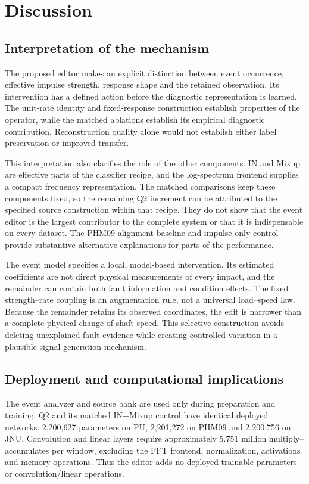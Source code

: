 \documentclass[a4paper,fleqn]{cas-sc}
\begin{document}


\section{Discussion}
\subsection{Interpretation of the mechanism}
The proposed editor makes an explicit distinction between event occurrence, effective impulse strength, response shape and the retained observation. Its intervention has a defined action before the diagnostic representation is learned. The unit-rate identity and fixed-response construction establish properties of the operator, while the matched ablations establish its empirical diagnostic contribution. Reconstruction quality alone would not establish either label preservation or improved transfer.

This interpretation also clarifies the role of the other components. IN and Mixup are effective parts of the classifier recipe, and the log-spectrum frontend supplies a compact frequency representation. The matched comparisons keep these components fixed, so the remaining Q2 increment can be attributed to the specified source construction within that recipe. They do not show that the event editor is the largest contributor to the complete system or that it is indispensable on every dataset. The PHM09 alignment baseline and impulse-only control provide substantive alternative explanations for parts of the performance.

The event model specifies a local, model-based intervention. Its estimated coefficients are not direct physical measurements of every impact, and the remainder can contain both fault information and condition effects. The fixed strength--rate coupling is an augmentation rule, not a universal load--speed law. Because the remainder retains its observed coordinates, the edit is narrower than a complete physical change of shaft speed. This selective construction avoids deleting unexplained fault evidence while creating controlled variation in a plausible signal-generation mechanism.

\subsection{Deployment and computational implications}
The event analyzer and source bank are used only during preparation and training. Q2 and its matched IN+Mixup control have identical deployed networks: 2,200,627 parameters on PU, 2,201,272 on PHM09 and 2,200,756 on JNU. Convolution and linear layers require approximately 5.751 million multiply--accumulates per window, excluding the FFT frontend, normalization, activations and memory operations. Thus the editor adds no deployed trainable parameters or convolution/linear operations.
\end{document}
